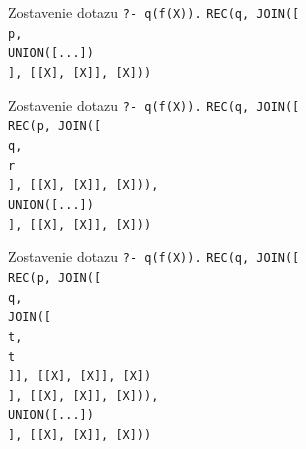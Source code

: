 \documentclass[11pt,aspectratio=169]{beamer}
\begin{document}
\begin{frame}{Zostavenie dotazu \texttt{?- q(f(X)).}}
    \texttt{REC(q, JOIN([\\
        \hspace{1em} p,\\
        \hspace{1em} UNION([...])\\
        ], [[X], [X]], [X]))
    }
\end{frame}

\begin{frame}{Zostavenie dotazu \texttt{?- q(f(X)).}}
    \texttt{REC(q, JOIN([\\
        \hspace{1em} REC(p, JOIN([\\
        \hspace{2em} q,\\
        \hspace{2em} r\\
        \hspace{1em} ], [[X], [X]], [X])),\\
        \hspace{1em} UNION([...])\\
        ], [[X], [X]], [X]))
    }
\end{frame}

\begin{frame}{Zostavenie dotazu \texttt{?- q(f(X)).}}
    \texttt{REC(q, JOIN([\\
        \hspace{1em} REC(p, JOIN([\\
        \hspace{2em} q,\\
        \hspace{2em} JOIN([\\
        \hspace{3em} t,\\
        \hspace{3em} t\\
        \hspace{2em} ]], [[X], [X]], [X])\\
        \hspace{1em} ], [[X], [X]], [X])),\\
        \hspace{1em} UNION([...])\\
        ], [[X], [X]], [X]))
    }
\end{frame}
\end{document}
